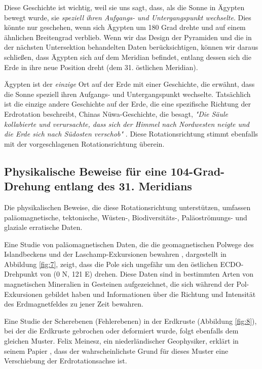 \documentclass[10pt,twocolumn,letterpaper]{article}
\begin{document}
Diese Geschichte ist wichtig, weil sie uns sagt, dass, als die Sonne in Ägypten bewegt wurde, sie \textit{speziell ihren Aufgangs- und Untergangspunkt wechselte}. Dies könnte nur geschehen, wenn sich Ägypten um 180 Grad drehte und auf einem ähnlichen Breitengrad verblieb. Wenn wir das Design der Pyramiden und die in der nächsten Untersektion behandelten Daten berücksichtigen, können wir daraus schließen, dass Ägypten sich auf dem Meridian befindet, entlang dessen sich die Erde in ihre neue Position dreht (dem 31. östlichen Meridian).

Ägypten ist der \textit{einzige} Ort auf der Erde mit einer Geschichte, die erwähnt, dass die Sonne speziell ihren Aufgangs- und Untergangspunkt wechselte. Tatsächlich ist die einzige andere Geschichte auf der Erde, die eine spezifische Richtung der Erdrotation beschreibt, Chinas Nüwa-Geschichte, die besagt, \textit{"Die Säule kollabierte und verursachte, dass sich der Himmel nach Nordwesten neigte und die Erde sich nach Südosten verschob"} \cite{8}. Diese Rotationsrichtung stimmt ebenfalls mit der vorgeschlagenen Rotationsrichtung überein.

\subsection{Physikalische Beweise für eine 104-Grad-Drehung entlang des 31. Meridians}

Die physikalischen Beweise, die diese Rotationsrichtung unterstützen, umfassen paläomagnetische, tektonische, Wüsten-, Biodiversitäts-, Paläoströmungs- und glaziale erratische Daten.

Eine Studie von paläomagnetischen Daten, die die geomagnetischen Polwege des Islandbeckens und der Laschamp-Exkursionen bewahren \cite{35}, dargestellt in Abbildung \ref{fig:7}, zeigt, dass die Pole sich ungefähr um den östlichen ECDO-Drehpunkt von (0 N, 121 E) drehen. Diese Daten sind in bestimmten Arten von magnetischen Mineralien in Gesteinen aufgezeichnet, die sich während der Pol-Exkursionen gebildet haben und Informationen über die Richtung und Intensität des Erdmagnetfeldes zu jener Zeit bewahren.

Eine Studie der Scherebenen (Fehlerebenen) in der Erdkruste (Abbildung \ref{fig:8}), bei der die Erdkruste gebrochen oder deformiert wurde, folgt ebenfalls dem gleichen Muster. Felix Meinesz, ein niederländischer Geophysiker, erklärt in seinem Papier \cite{36}, dass der wahrscheinlichste Grund für dieses Muster eine Verschiebung der Erdrotationsachse ist.
\end{document}
